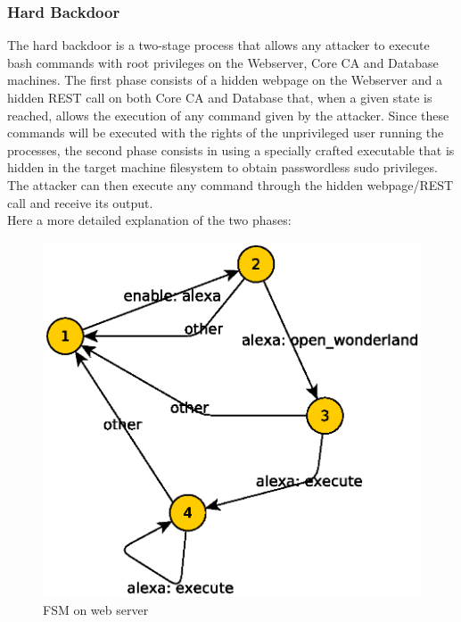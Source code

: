 \documentclass[english]{article}
\begin{document}
{\subsubsection{Hard Backdoor}
The hard backdoor is a two-stage process that allows any attacker to execute bash commands with root privileges on the Webserver, Core CA and Database machines. The first phase consists of a hidden webpage on the Webserver and a hidden
REST call on both Core CA and Database that, when a given state is reached, allows the execution of any command given by the attacker. Since these commands will be executed with the rights of the unprivileged user running the processes, 
the second phase consists in using a specially crafted executable that is hidden in the target machine filesystem to obtain passwordless sudo privileges. The attacker can then execute any command through the hidden webpage/REST call and 
receive its output. \\
Here a more detailed explanation of the two phases:
\begin{figure}[!tbp]
  \centering
  \begin{minipage}[b]{0.49\textwidth}
    \includegraphics[width=\textwidth]{res/webserver_fsm.eps}
    \caption{FSM on web server}
    \label{fig:fsm_ws}
  \end{minipage}
  \hfill
  \begin{minipage}[b]{0.49\textwidth}

\end{minipage}
\end{figure}}
\end{document}
